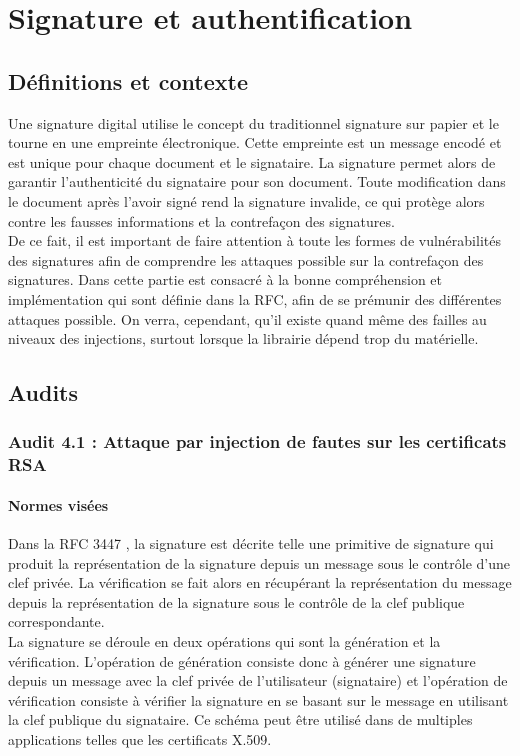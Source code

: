 \chapter{Signature et authentification}
\section{Définitions et contexte}

Une signature digital utilise le concept du traditionnel signature sur papier et le tourne en une empreinte électronique. Cette empreinte est un message encodé et est unique pour chaque document et le signataire. La signature permet alors de garantir l'authenticité du signataire pour son document. Toute modification dans le document après l'avoir signé rend la signature invalide, ce qui protège alors contre les fausses informations et la contrefaçon des signatures.\\

De ce fait, il est important de faire attention à toute les formes de vulnérabilités des signatures afin de comprendre les attaques possible sur la contrefaçon des signatures. Dans cette partie est consacré à la bonne compréhension et implémentation qui sont définie dans la RFC, afin de se prémunir des différentes attaques possible. On verra, cependant, qu'il existe quand même des failles au niveaux des injections, surtout lorsque la librairie dépend trop du matérielle. 


\section{Audits}
	\subsection{Audit 4.1 : Attaque par injection de fautes sur les certificats RSA}
		\subsubsection{Normes visées}
Dans la RFC 3447 \cite{rfc3447}, la signature est décrite telle une primitive de signature qui produit la représentation de la signature depuis un message sous le contrôle d'une clef privée. La vérification se fait alors en récupérant la représentation du message depuis la représentation de la signature sous le contrôle de la clef publique correspondante.\\

La signature se déroule en  deux opérations qui sont la génération et la vérification. L'opération de génération consiste donc à générer une signature depuis un message avec la clef privée de l'utilisateur (signataire) et l'opération de vérification consiste à vérifier la signature en se basant sur le message en utilisant la clef publique du signataire. 
Ce schéma peut être utilisé dans de multiples applications telles que les certificats X.509.\\


